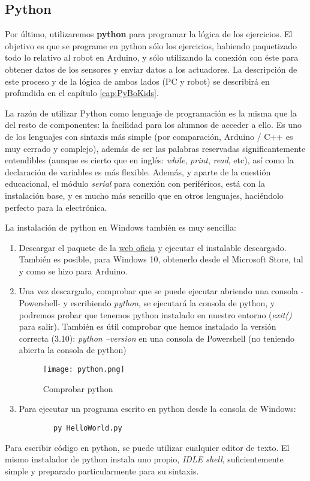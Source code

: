 \subsection{Python}\label{subsec:python}
Por último, utilizaremos \textbf{python} para programar la lógica de los ejercicios. El objetivo es que se programe en python sólo los ejercicios, habiendo paquetizado todo lo relativo al robot en Arduino, y sólo utilizando la conexión con éste para obtener datos de los sensores y enviar datos a los actuadores. La descripción de este proceso y de la lógica de ambos lados (PC y robot) se describirá en profundida en el capítulo \ref{cap:PyBoKids}.
\par La razón de utilizar Python como lenguaje de programación es la misma que la del resto de componentes: la facilidad para los alumnos de acceder a ello. Es uno de los lenguajes con sintaxis más simple (por comparación, Arduino / C++ es muy cerrado y complejo), además de ser las palabras reservadas significantemente entendibles (aunque es cierto que en inglés: \textit{while}, \textit{print}, \textit{read}, etc), así como la declaración de variables es más flexible. Además, y aparte de la cuestión educacional, el módulo \textit{serial} para conexión con periféricos, está con la instalación base, y es mucho más sencillo que en otros lenguajes, haciéndolo perfecto para la electrónica. 
\par La instalación de python en Windows también es muy sencilla:
\begin{enumerate}\label{list:instalacionPython}
	\item Descargar el paquete de la \href{https://www.python.org/downloads/}{web oficia} y ejecutar el instalable descargado.
	También es posible, para Windows 10, obtenerlo desde el Microsoft Store, tal y como se hizo para Arduino.
	\item Una vez descargado, comprobar que se puede ejecutar abriendo una consola -Powershell- y escribiendo \textit{python},	se ejecutará la consola de python, y podremos probar que tenemos python instalado en nuestro entorno (\textit{exit()} para salir). También es útil comprobar que hemos instalado la versión correcta (3.10): \textit{python --version} en una consola de Powershell (no teniendo abierta la consola de python)
	\begin{figure}[h]
		\texttt{[image: python.png]}
		\centering
		\label{img:python}
		\caption{Comprobar python}
	\end{figure}
	\item Para ejecutar un programa escrito en python desde la consola de Windows: 
	\begin{verbatim}
		py HelloWorld.py
	\end{verbatim}
\end{enumerate}
Para escribir código en python, se puede utilizar cualquier editor de texto. El mismo instalador de python instala uno propio, \textit{IDLE shell}, suficientemente simple y preparado particularmente para su sintaxis.
